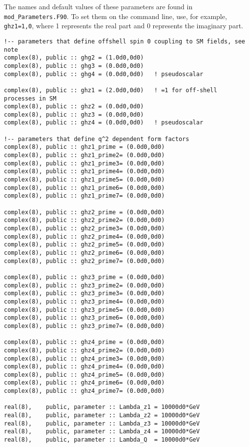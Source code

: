 \documentclass[aps,superscriptaddress,nofootinbib]{revtex4}
\begin{document}
The names and default values of these parameters are found in \verb|mod_Parameters.F90|.  To set them on the command line, use, for example, \verb|ghz1=1,0|, where 1 represents the real part and 0 represents the imaginary part.
\begin{verbatim}
!-- parameters that define offshell spin 0 coupling to SM fields, see note
complex(8), public :: ghg2 = (1.0d0,0d0)
complex(8), public :: ghg3 = (0.0d0,0d0)
complex(8), public :: ghg4 = (0.0d0,0d0)   ! pseudoscalar

complex(8), public :: ghz1 = (2.0d0,0d0)   ! =1 for off-shell processes in SM
complex(8), public :: ghz2 = (0.0d0,0d0)
complex(8), public :: ghz3 = (0.0d0,0d0)
complex(8), public :: ghz4 = (0.0d0,0d0)   ! pseudoscalar

!-- parameters that define q^2 dependent form factors
complex(8), public :: ghz1_prime = (0.0d0,0d0)
complex(8), public :: ghz1_prime2= (0.0d0,0d0)
complex(8), public :: ghz1_prime3= (0.0d0,0d0)
complex(8), public :: ghz1_prime4= (0.0d0,0d0)
complex(8), public :: ghz1_prime5= (0.0d0,0d0)
complex(8), public :: ghz1_prime6= (0.0d0,0d0)
complex(8), public :: ghz1_prime7= (0.0d0,0d0)

complex(8), public :: ghz2_prime = (0.0d0,0d0)
complex(8), public :: ghz2_prime2= (0.0d0,0d0)
complex(8), public :: ghz2_prime3= (0.0d0,0d0)
complex(8), public :: ghz2_prime4= (0.0d0,0d0)
complex(8), public :: ghz2_prime5= (0.0d0,0d0)
complex(8), public :: ghz2_prime6= (0.0d0,0d0)
complex(8), public :: ghz2_prime7= (0.0d0,0d0)

complex(8), public :: ghz3_prime = (0.0d0,0d0)
complex(8), public :: ghz3_prime2= (0.0d0,0d0)
complex(8), public :: ghz3_prime3= (0.0d0,0d0)
complex(8), public :: ghz3_prime4= (0.0d0,0d0)
complex(8), public :: ghz3_prime5= (0.0d0,0d0)
complex(8), public :: ghz3_prime6= (0.0d0,0d0)
complex(8), public :: ghz3_prime7= (0.0d0,0d0)

complex(8), public :: ghz4_prime = (0.0d0,0d0)
complex(8), public :: ghz4_prime2= (0.0d0,0d0)
complex(8), public :: ghz4_prime3= (0.0d0,0d0)
complex(8), public :: ghz4_prime4= (0.0d0,0d0)
complex(8), public :: ghz4_prime5= (0.0d0,0d0)
complex(8), public :: ghz4_prime6= (0.0d0,0d0)
complex(8), public :: ghz4_prime7= (0.0d0,0d0)

real(8),    public, parameter :: Lambda_z1 = 10000d0*GeV
real(8),    public, parameter :: Lambda_z2 = 10000d0*GeV
real(8),    public, parameter :: Lambda_z3 = 10000d0*GeV
real(8),    public, parameter :: Lambda_z4 = 10000d0*GeV
real(8),    public, parameter :: Lambda_Q  = 10000d0*GeV


\end{verbatim}
\end{document}
